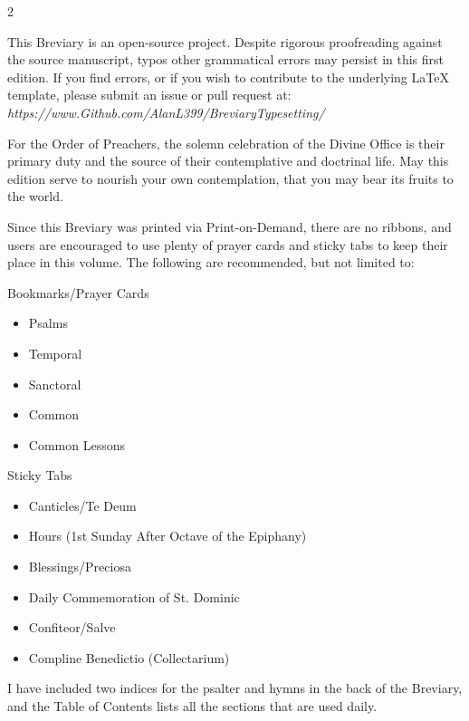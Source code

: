 \begin{multicols*}{2}
{\color{Red} }


This Breviary is an open-source project. Despite rigorous proofreading against the source manuscript, typos other grammatical errors may persist in this first edition. If you find errors, or if you wish to contribute to the underlying LaTeX template, please submit an issue or pull request at: \emph{https://www.Github.com/AlanL399/BreviaryTypesetting/}

For the Order of Preachers, the solemn celebration of the Divine Office is their primary duty and the source of their contemplative and doctrinal life. May this edition serve to nourish your own contemplation, that you may bear its fruits to the world.


{\color{Red} }
Since this Breviary was printed via Print-on-Demand, there are no ribbons, and users are encouraged to use plenty of prayer cards and sticky tabs to keep their place in this volume. The following are recommended, but not limited to:

Bookmarks/Prayer Cards
\begin{itemize}
	\item Psalms
	\item Temporal
	\item Sanctoral
	\item Common
	\item Common Lessons
\end{itemize}


Sticky Tabs
\begin{itemize}
	\item Canticles/Te Deum
	\item Hours (1st Sunday After Octave of the Epiphany)
	\item Blessings/Preciosa
	\item Daily Commemoration of St. Dominic
	\item Confiteor/Salve
	\item Compline Benedictio (Collectarium)
\end{itemize}

I have included two indices for the psalter and hymns in the back of the Breviary, and the Table of Contents lists all the sections that are used daily.


{\color{Red} }



\end{multicols*}
